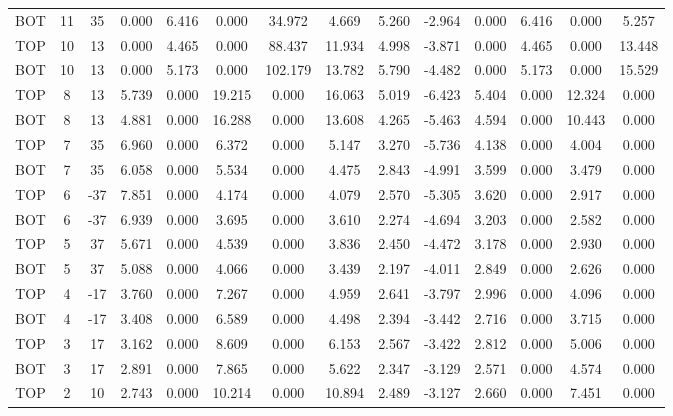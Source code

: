 \begin{landscape}
\begin{table}
\begin{tabular}{|ccc|ccccc|cc|cccc|}
BOT & 11 &  35 &   0.000 &   6.416 &   0.000 &  34.972 &  4.669 & 5.260 & -2.964 &    0.000 &    6.416 &    0.000 &    5.257 \\
TOP & 10 &  13 &   0.000 &   4.465 &   0.000 &  88.437 & 11.934 & 4.998 & -3.871 &    0.000 &    4.465 &    0.000 &   13.448 \\
BOT & 10 &  13 &   0.000 &   5.173 &   0.000 & 102.179 & 13.782 & 5.790 & -4.482 &    0.000 &    5.173 &    0.000 &   15.529 \\
TOP &  8 &  13 &   5.739 &   0.000 &  19.215 &   0.000 & 16.063 & 5.019 & -6.423 &    5.404 &    0.000 &   12.324 &    0.000 \\
BOT &  8 &  13 &   4.881 &   0.000 &  16.288 &   0.000 & 13.608 & 4.265 & -5.463 &    4.594 &    0.000 &   10.443 &    0.000 \\
TOP &  7 &  35 &   6.960 &   0.000 &   6.372 &   0.000 &  5.147 & 3.270 & -5.736 &    4.138 &    0.000 &    4.004 &    0.000 \\
BOT &  7 &  35 &   6.058 &   0.000 &   5.534 &   0.000 &  4.475 & 2.843 & -4.991 &    3.599 &    0.000 &    3.479 &    0.000 \\
TOP &  6 & -37 &   7.851 &   0.000 &   4.174 &   0.000 &  4.079 & 2.570 & -5.305 &    3.620 &    0.000 &    2.917 &    0.000 \\
BOT &  6 & -37 &   6.939 &   0.000 &   3.695 &   0.000 &  3.610 & 2.274 & -4.694 &    3.203 &    0.000 &    2.582 &    0.000 \\
TOP &  5 &  37 &   5.671 &   0.000 &   4.539 &   0.000 &  3.836 & 2.450 & -4.472 &    3.178 &    0.000 &    2.930 &    0.000 \\
BOT &  5 &  37 &   5.088 &   0.000 &   4.066 &   0.000 &  3.439 & 2.197 & -4.011 &    2.849 &    0.000 &    2.626 &    0.000 \\
TOP &  4 & -17 &   3.760 &   0.000 &   7.267 &   0.000 &  4.959 & 2.641 & -3.797 &    2.996 &    0.000 &    4.096 &    0.000 \\
BOT &  4 & -17 &   3.408 &   0.000 &   6.589 &   0.000 &  4.498 & 2.394 & -3.442 &    2.716 &    0.000 &    3.715 &    0.000 \\
TOP &  3 &  17 &   3.162 &   0.000 &   8.609 &   0.000 &  6.153 & 2.567 & -3.422 &    2.812 &    0.000 &    5.006 &    0.000 \\
BOT &  3 &  17 &   2.891 &   0.000 &   7.865 &   0.000 &  5.622 & 2.347 & -3.129 &    2.571 &    0.000 &    4.574 &    0.000 \\
TOP &  2 &  10 &   2.743 &   0.000 &  10.214 &   0.000 & 10.894 & 2.489 & -3.127 &    2.660 &    0.000 &    7.451 &    0.000 \\

\end{tabular}
\end{table}
\end{landscape}
